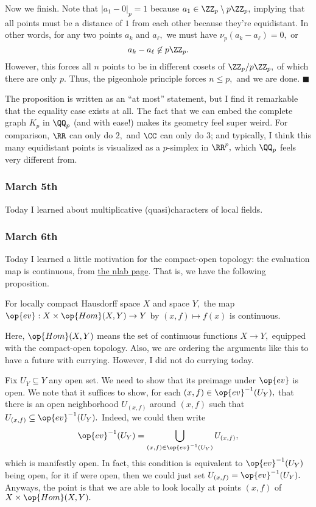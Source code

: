 Now we finish. Note that $|a_1-0|_p=1$ because $a_1\in\ZZ_p\setminus p\ZZ_p,$ implying that all points must be a distance of $1$ from each other because they're equidistant. In other words, for any two points $a_k$ and $a_\ell,$ we must have $\nu_p(a_k-a_\ell)=0,$ or
\[a_k-a_\ell\not\in p\ZZ_p.\]
However, this forces all $n$ points to be in different cosets of $\ZZ_p/p\ZZ_p,$ of which there are only $p.$ Thus, the pigeonhole principle forces $n\le p,$ and we are done. $\blacksquare$

The proposition is written as an ``at most'' statement, but I find it remarkable that the equality case exists at all. The fact that we can embed the complete graph $K_p$ in $\QQ_p$ (and with ease!) makes its geometry feel super weird. For comparison, $\RR$ can only do $2,$ and $\CC$ can only do $3$; and typically, I think this many equidistant points is visualized as a $p$-simplex in $\RR^p,$ which $\QQ_p$ feels very different from.

\subsubsection{March 5th}
Today I learned about multiplicative (quasi)characters of local fields.

\subsubsection{March 6th}
Today I learned a little motivation for the compact-open topology: the evaluation map is continuous, from \href{https://ncatlab.org/nlab/show/compact-open+topology}{the nlab page}. That is, we have the following proposition.
\begin{proposition}
    For locally compact Hausdorff space $X$ and space $Y,$ the map $\op{ev}:X\times\op{Hom}(X,Y)\to Y$ by $(x,f)\mapsto f(x)$ is continuous.
\end{proposition}
Here, $\op{Hom}(X,Y)$ means the set of continuous functions $X\to Y,$ equipped with the compact-open topology. Also, we are ordering the arguments like this to have a future with currying. However, I did not do currying today.

Fix $U_Y\subseteq Y$ any open set. We need to show that its preimage under $\op{ev}$ is open. We note that it suffices to show, for each $(x,f)\in\op{ev}^{-1}(U_Y),$ that there is an open neighborhood $U_{(x,f)}$ around $(x,f)$ such that $U_{(x,f)}\subseteq\op{ev}^{-1}(U_Y).$ Indeed, we could then write
\[\op{ev}^{-1}(U_Y)=\bigcup_{(x,f)\in\op{ev}^{-1}(U_Y)}U_{(x,f)},\]
which is manifestly open. In fact, this condition is equivalent to $\op{ev}^{-1}(U_Y)$ being open, for it if were open, then we could just set $U_{(x,f)}=\op{ev}^{-1}(U_Y).$ Anyways, the point is that we are able to look locally at points $(x,f)$ of $X\times\op{Hom}(X,Y).$

